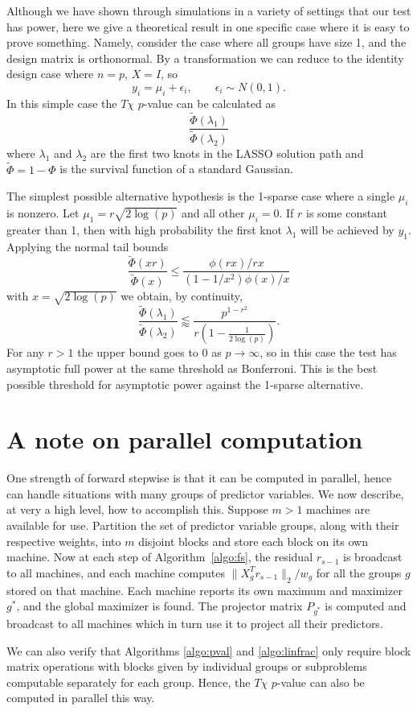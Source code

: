 \documentclass{imsart}
\begin{document}
Although we have shown through simulations in a variety of settings that
our test has power, here we give a theoretical result in one specific case
where it is easy to prove something. Namely, consider the case where all
groups have size 1, and the design matrix is orthonormal. By a
transformation we can reduce to the identity design case where $n=p$,
$X=I$, so
\[
y_i = \mu_i + \epsilon_i, \qquad \epsilon_i \sim N(0,1).
\]
In this simple case the $T\chi$ $p$-value can be calculated as
\[
\frac{\tilde \Phi(\lambda_1)}{\tilde \Phi(\lambda_2)}
\]
where $\lambda_1$ and $\lambda_2$ are the first two knots in the LASSO
solution path and $\tilde \Phi = 1 - \Phi$ is the survival function of
a standard Gaussian. 


The simplest possible alternative hypothesis
is the 1-sparse case where a single $\mu_i$ is nonzero. Let
$\mu_1 = r \sqrt{2\log(p)}$ and all other $\mu_i = 0$. If $r$ is some
constant greater than 1, then with high probability the first
knot $\lambda_1$ will be achieved by $y_1$. 
Applying the normal tail bounds
\[
\frac{\tilde \Phi(xr)}
{\tilde\Phi(x)} \leq \frac{\phi(rx)/rx}{(1-1/x^2)\phi(x)/x}
\]
with $x = \sqrt{2\log(p)}$ we obtain, by continuity,
\[
 \frac{\tilde \Phi(\lambda_1)}{\tilde \Phi(\lambda_2)}
\lessapprox \frac{p^{1-r^2}}{r\left(1-\frac{1}{2\log(p)}\right)}.
\]
For any $r > 1$ the upper bound goes to 0 as $p \to \infty$, so
in this case the test has asymptotic full power at the same threshold
as Bonferroni. This is the best possible threshold for asymptotic power
against the 1-sparse alternative.

\section{A note on parallel computation}
\label{app:computation}

One strength of forward stepwise is that it can be computed in parallel, hence can handle situations with many groups of predictor variables. We now describe, at very a high level, how to accomplish this. Suppose $m > 1$ machines are available for use. Partition the set of predictor variable groups, along with their respective weights, into $m$ disjoint blocks and store each block on its own machine. Now at each step of Algorithm~\ref{algo:fs}, the residual $r_{s-1}$ is broadcast to all machines, and each machine computes $\| X_g^T r_{s-1} \|_2/w_g$ for all the groups $g$ stored on that machine. Each machine reports its own maximum and maximizer $g^*$, and the global maximizer is found. The projector matrix $P_{g^*}$ is computed and broadcast to all machines which in turn use it to project all their predictors.

We can also verify that Algorithms \ref{algo:pval} and \ref{algo:linfrac} only require block matrix operations with blocks given by individual groups
or subproblems computable separately for each group. Hence, the $T\chi$ $p$-value can also be computed in parallel this way.
\end{document}
